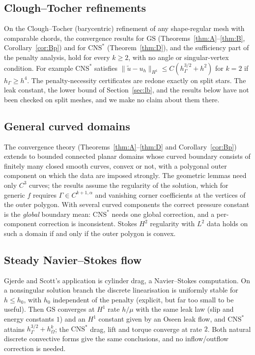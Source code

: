 \documentclass[pdflatex,sn-mathphys-num]{sn-jnl}
\theoremstyle{thmstyleone}
\theoremstyle{thmstylethree}
\newcommand{\hG}{h_\Gamma}
\newcommand{\hO}{h_\Omega}
\newcommand{\ut}{\tilde u}
\newcommand{\norm}[1]{\lVert #1\rVert}
\newcommand{\GS}{\mathrm{GS}}
\newcommand{\CNS}{\mathrm{CNS}^\ast}
\begin{document}
\subsection{Clough--Tocher refinements}
On the Clough--Tocher (barycentric) refinement of any shape-regular mesh with comparable chords, the convergence results for $\GS$ (Theorems~\ref{thm:A}--\ref{thm:B}, Corollary~\ref{cor:Bp}) and for $\CNS$ (Theorem~\ref{thm:D}), and the sufficiency part of the penalty analysis, hold for every $k\ge2$, with no angle or singular-vertex condition. For example $\CNS$ satisfies $\norm{\ut-u_h}_{H^1}\le C(\hG^{3/2}+h^2)$ for $k=2$ if $\hG\ge h^4$. The penalty-necessity certificates are redone exactly on split stars. The leak constant, the lower bound of Section~\ref{sec:lb}, and the results below have not been checked on split meshes, and we make no claim about them there.

\subsection{General curved domains}
The convergence theory (Theorems~\ref{thm:A}--\ref{thm:D} and Corollary~\ref{cor:Bp}) extends to bounded connected planar domains whose curved boundary consists of finitely many closed smooth curves, convex or not, with a polygonal outer component on which the data are imposed strongly. The geometric lemmas need only $C^3$ curves; the results assume the regularity of the solution, which for generic $f$ requires $\Gamma\in C^{k+1,\alpha}$ and vanishing corner coefficients at the vertices of the outer polygon. With several curved components the correct pressure constant is the \emph{global} boundary mean: $\CNS$ needs one global correction, and a per-component correction is inconsistent. Stokes $H^2$ regularity with $L^2$ data holds on such a domain if and only if the outer polygon is convex.

\subsection{Steady Navier--Stokes flow}
Gjerde and Scott's application is cylinder drag, a Navier--Stokes computation. On a nonsingular solution branch the discrete linearisation is uniformly stable for $h\le h_0$, with $h_0$ independent of the penalty (explicit, but far too small to be useful). Then $\GS$ converges at $H^1$ rate $h/\mu$ with the same leak law (slip and energy constants $1$) and an $H^1$ constant given by an Oseen leak flow, and $\CNS$ attains $\hG^{3/2}+\hO^k$; the $\CNS$ drag, lift and torque converge at rate $2$. Both natural discrete convective forms give the same conclusions, and no inflow/outflow correction is needed.
\end{document}
